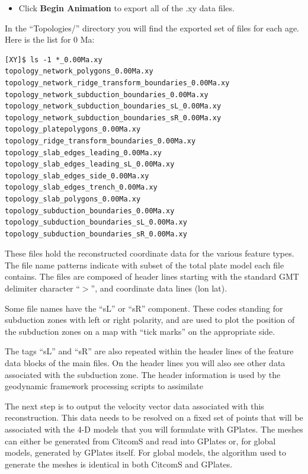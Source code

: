 \documentclass[letterpaper,12pt]{article}
\newcommand{\gp}[1]{\textbf{#1}}
\begin{document}
\begin{itemize}
\item Click \gp{Begin Animation} to export all of the .xy data files.
\end{itemize}

In the ``Topologies/'' directory you will find the exported set of files for each age.  
Here is the list for 0 Ma:

\begin{verbatim}
[XY]$ ls -1 *_0.00Ma.xy
topology_network_polygons_0.00Ma.xy
topology_network_ridge_transform_boundaries_0.00Ma.xy
topology_network_subduction_boundaries_0.00Ma.xy
topology_network_subduction_boundaries_sL_0.00Ma.xy
topology_network_subduction_boundaries_sR_0.00Ma.xy
topology_platepolygons_0.00Ma.xy
topology_ridge_transform_boundaries_0.00Ma.xy
topology_slab_edges_leading_0.00Ma.xy
topology_slab_edges_leading_sL_0.00Ma.xy
topology_slab_edges_side_0.00Ma.xy
topology_slab_edges_trench_0.00Ma.xy
topology_slab_polygons_0.00Ma.xy
topology_subduction_boundaries_0.00Ma.xy
topology_subduction_boundaries_sL_0.00Ma.xy
topology_subduction_boundaries_sR_0.00Ma.xy
\end{verbatim}

These files hold the reconstructed coordinate data for the various feature types.
The file name patterns indicate with subset of the total plate model each file contains.
The files are composed of header lines starting with the standard GMT delimiter character ``$>$'',
and coordinate data lines (lon lat).

Some file names have the ``sL'' or ``sR'' component.
These codes standing for subduction zones with left or right polarity,
and are used to plot the position of the subduction zones on a map with ``tick marks'' on the appropriate side.

The tags ``sL'' and ``sR'' are also repeated within the header lines of the feature data blocks of the main files.
On the header lines you will also see other data associated with the subduction zone. 
The header information is used by the geodynamic framework processing scripts to assimilate 

The next step is to output the velocity vector data associated with this reconstruction.  
This data needs to be resolved on a fixed set of points that will be associated with 
the 4-D models that you will formulate with GPlates.  
The meshes can either be generated from CitcomS and read into GPlates or, 
for global models, generated by GPlates itself.  
For global models, the algorithm used to generate the meshes is identical in 
both CitcomS and GPlates.
\end{document}
